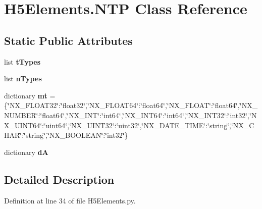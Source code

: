 \hypertarget{classH5Elements_1_1NTP}{
\section{H5Elements.NTP Class Reference}
\label{classH5Elements_1_1NTP}
}
\subsection*{Static Public Attributes}
\begin{DoxyCompactItemize}
\item 
list {\bfseries tTypes}
\item 
list {\bfseries nTypes}
\item 
\hypertarget{classH5Elements_1_1NTP_a05bf30cad9ac73ab9e1128b561b6b32f}{
dictionary {\bfseries mt} = \{\char`\"{}NX\_\-FLOAT32\char`\"{}:\char`\"{}float32\char`\"{},\char`\"{}NX\_\-FLOAT64\char`\"{}:\char`\"{}float64\char`\"{},\char`\"{}NX\_\-FLOAT\char`\"{}:\char`\"{}float64\char`\"{},\char`\"{}NX\_\-NUMBER\char`\"{}:\char`\"{}float64\char`\"{},\char`\"{}NX\_\-INT\char`\"{}:\char`\"{}int64\char`\"{},\char`\"{}NX\_\-INT64\char`\"{}:\char`\"{}int64\char`\"{},\char`\"{}NX\_\-INT32\char`\"{}:\char`\"{}int32\char`\"{},\char`\"{}NX\_\-UINT64\char`\"{}:\char`\"{}uint64\char`\"{},\char`\"{}NX\_\-UINT32\char`\"{}:\char`\"{}uint32\char`\"{},\char`\"{}NX\_\-DATE\_\-TIME\char`\"{}:\char`\"{}string\char`\"{},\char`\"{}NX\_\-CHAR\char`\"{}:\char`\"{}string\char`\"{},\char`\"{}NX\_\-BOOLEAN\char`\"{}:\char`\"{}int32\char`\"{}\}}
\label{classH5Elements_1_1NTP_a05bf30cad9ac73ab9e1128b561b6b32f}

\item 
dictionary {\bfseries dA}
\end{DoxyCompactItemize}


\subsection{Detailed Description}


Definition at line 34 of file H5Elements.py.

